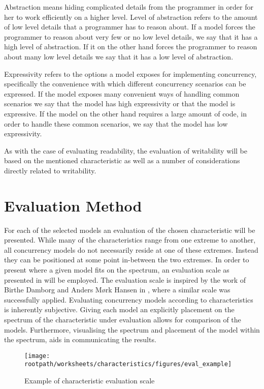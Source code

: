 Abstraction means hiding complicated details from the programmer in order for her to work efficiently on a higher level\cite[p. 14]{sebestaProLang}. Level of abstraction refers to the amount of low level details that a programmer has to reason about. If a model forces the programmer to reason about very few or no low level details, we say that it has a high level of abstraction. If it on the other hand forces the programmer to reason about many low level details we say that it has a low level of abstraction.

Expressivity refers to the options a model exposes for implementing concurrency, specifically the convenience with which different concurrency scenarios can be expressed. If the model exposes many convenient ways of handling common scenarios we say that the model has high expressivity or that the model is expressive. If the model on the other hand requires a large amount of code, in order to handle these common scenarios, we say that the model has low expressivity.

As with the case of evaluating readability, the evaluation of writability will be based on the mentioned characteristic as well as a number of considerations directly related to writability.

\section{Evaluation Method}\label{sec:char_eval_method}
For each of the selected models an evaluation of the chosen characteristic will be presented. While many of the characteristics range from one extreme to another, all concurrency models do not necessarily reside at one of these extremes. Instead they can be positioned at some point in-between the two extremes. In order to present where a given model fits on the spectrum, an evaluation scale as presented in  will be employed. The evaluation scale is inspired by the work of Birthe Damborg and Anders Mørk Hansen in \cite{StudyInConcurrency}, where a similar scale was successfully applied. Evaluating concurrency models according to characteristics is inherently subjective. Giving each model an explicitly placement on the spectrum of the characteristic under evaluation allows for comparison of the models. Furthermore, visualising the spectrum and placement of the model within the spectrum, aids in communicating the results.

\begin{figure}[ht!]
\centering
\texttt{[image: \\rootpath/worksheets/characteristics/figures/eval\_example]}
\caption{Example of characteristic evaluation scale}\label{fig:char_evel_example}
\end{figure}

